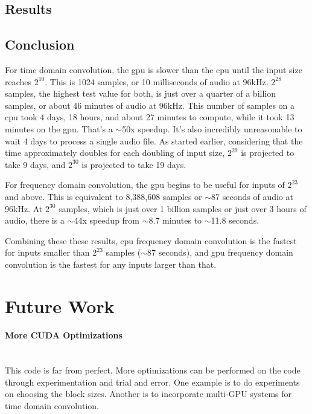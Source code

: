 



\subsection{Results}


\subsection{Conclusion}

\indent \par For time domain convolution, the \gls{gpu} is slower than the \gls{cpu} until the input size reaches $2^{10}$. This is 1024 samples, or 10 milliseconds of audio at 96kHz. $2^{28}$ samples, the highest test value for both, is just over a quarter of a billion samples, or about 46 minutes of audio at 96kHz. This number of samples on a \gls{cpu} took 4 days, 18 hours, and about 27 minutes to compute, while it took 13 minutes on the \gls{gpu}. That's a $\sim$50x speedup. It's also incredibly unreasonable to wait 4 days to process a single audio file. As started earlier, considering that the time approximately doubles for each doubling of input size, $2^{29}$ is projected to take 9 days, and $2^{30}$ is projected to take 19 days. 

For frequency domain convolution, the \gls{gpu} begins to be useful for inputs of $2^{23}$ and above. This is equivalent to 8,388,608 samples or $\sim$87 seconds of audio at 96kHz. At $2^{30}$ samples, which is just over 1 billion samples or just over 3 hours of audio, there is a $\sim$44x speedup from $\sim$8.7 minutes to $\sim$11.8 seconds.


Combining these these results, \gls{cpu} frequency domain convolution is the fastest for inputs smaller than $2^{23}$ samples ($\sim$87 seconds), and \gls{gpu} frequency domain convolution is the fastest for any inputs larger than that. 

\section{Future Work}

\paragraph{More CUDA Optimizations} \hspace{0pt} \\
\indent This code is far from perfect. More optimizations can be performed on the code through experimentation and trial and error. One example is to do experiments on choosing the block sizes. Another is to incorporate multi-GPU systems for time domain convolution. 


